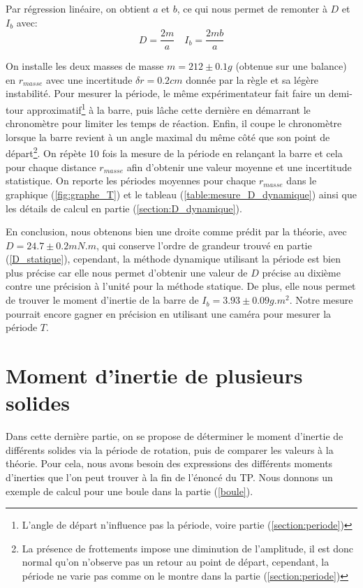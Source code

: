 \documentclass[11pt]{article}
\begin{document}
Par régression linéaire, on obtient $a$ et $b$, ce qui nous permet de remonter à $D$ et $I_b$ avec:
\begin{equation}
    D = \frac{2m}{a} \quad I_b = \frac{2mb}{a}
\end{equation}

On installe les deux masses de masse $m = 212 \pm 0.1g$ (obtenue sur une balance) en $r_{masse}$ avec une incertitude $\delta r = 0.2cm$ donnée par la règle et sa légère instabilité.
Pour mesurer la période, le même expérimentateur fait faire un demi-tour approximatif\footnote{L'angle de départ n'influence pas la période, voire partie (\ref{section:periode})} à la barre,
puis lâche cette dernière en démarrant le chronomètre pour limiter les temps de réaction. Enfin, il coupe le chronomètre lorsque la barre revient à un angle maximal du même côté que son point de
départ\footnote{La présence de frottements impose une diminution de l'amplitude, il est donc normal qu'on n'observe pas un retour au point de départ, cependant, 
la période ne varie pas comme on le montre dans la partie (\ref{section:periode})}. 
On répète 10 fois la mesure de la période en relançant la barre et cela pour chaque distance $r_{masse}$ 
afin d'obtenir une valeur moyenne et une incertitude statistique. On reporte les périodes moyennes pour 
chaque $r_{masse}$ dans le graphique (\ref{fig:graphe_T}) et le tableau (\ref{table:mesure_D_dynamique}) ainsi que les détails de calcul en 
partie (\ref{section:D_dynamique}).

En conclusion, nous obtenons bien une droite comme prédit par la théorie, avec $D = 24.7 \pm 0.2 mN.m$, qui conserve l'ordre de grandeur trouvé en partie (\ref{D_statique}), cependant, la méthode
dynamique utilisant la période est bien plus précise car elle nous permet d'obtenir une valeur de $D$ précise au dixième contre une précision
à l'unité pour la méthode statique. De plus, elle nous permet de trouver le moment d'inertie de la barre de $I_b = 3.93 \pm 0.09g.m^2$. Notre mesure pourrait
encore gagner en précision en utilisant une caméra pour mesurer la période $T$.

\section{Moment d'inertie de plusieurs solides}
Dans cette dernière partie, on se propose de déterminer le moment d'inertie de différents solides via la période
de rotation, puis de comparer les valeurs à la théorie. Pour cela, nous avons besoin des expressions des différents moments d'inerties que l'on peut trouver à la fin de l'énoncé
du TP. Nous donnons un exemple de calcul pour une boule dans la partie (\ref{boule}).
\end{document}
